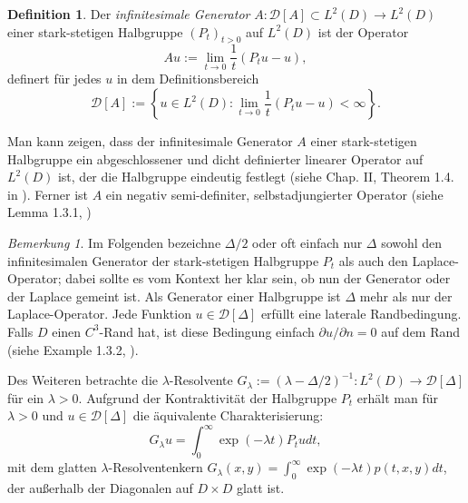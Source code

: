 \documentclass[10pt, a4paper, leqno, twoside, bibliography=totocnumbered, final]{scrartcl}
\theoremstyle{definition}
\newtheorem{defin}{Definition}[section]
\theoremstyle{plain}%
\theoremstyle{remark}
\newtheorem*{bem}{Bemerkung}
\begin{document}
\begin{defin} Der \emph{infinitesimale Generator} $ A: \mathcal{D}[A] \subset L^2(D) \to L^2(D) $ einer stark-stetigen Halbgruppe $ (P_t)_{t>0} $ auf $ L^2(D) $ ist der Operator 
\begin{equation}
\label{eq: Generatordef}
Au := \lim_{t \to 0} \frac{1}{t} \left( P_tu - u  \right),
\end{equation}
definert für jedes $ u $ in dem Definitionsbereich
\begin{equation*}
\mathcal{D}[A] := \left\lbrace u \in L^2(D) : \lim_{t \to 0} \frac{1}{t} \left( P_tu - u  \right) < \infty \right\rbrace.
\end{equation*}
\end{defin}

Man kann zeigen, dass der infinitesimale Generator $ A $ einer stark-stetigen Halbgruppe ein abgeschlossener und dicht definierter linearer Operator auf $ L^2(D) $ ist, der die Halbgruppe eindeutig festlegt (siehe Chap. II, Theorem 1.4. in \cite{Engel-Nagel}). Ferner ist $ A $ ein negativ semi-definiter, selbstadjungierter Operator (siehe Lemma 1.3.1, \cite{Fukushima})

\begin{bem}
Im Folgenden bezeichne $ \Delta / 2 $ oder oft einfach nur $ \Delta $ sowohl den infinitesimalen Generator der stark-stetigen Halbgruppe $ P_t $ als auch den Laplace-Operator; dabei sollte es vom Kontext her klar sein, ob nun der Generator oder der Laplace gemeint ist. Als Generator einer Halbgruppe ist $ \Delta $ mehr als nur der Laplace-Operator. Jede Funktion $ u \in \mathcal{D}[\Delta] $ erfüllt eine laterale Randbedingung. Falls $ D $ einen $ C^3 $-Rand hat, ist diese Bedingung einfach $ \partial u / \partial n  = 0 $ auf dem Rand (siehe Example 1.3.2, \cite{Fukushima}).
\end{bem}

Des Weiteren betrachte die $ \lambda $-Resolvente $ G_{\lambda} := ( \lambda - \Delta / 2 )^{-1} : L^2(D) \to \mathcal{D}[\Delta] $ für ein $ \lambda > 0 $. Aufgrund der Kontraktivität der Halbgruppe $ P_t $ erhält man für $ \lambda > 0 $ und $ u \in \mathcal{D}[\Delta] $ die äquivalente Charakterisierung:
\begin{equation}
\label{eq:Reslovente-Definition}
G_{\lambda} u = \int_0^{\infty} \exp( - \lambda t ) P_t u dt,
\end{equation}
mit dem glatten $ \lambda $-Resolventenkern $ G_{\lambda} (x,y) = \int_0^{\infty} \exp( - \lambda t ) p(t,x,y) dt $, der außerhalb der Diagonalen auf $ D \times D $ glatt ist.
\end{document}
